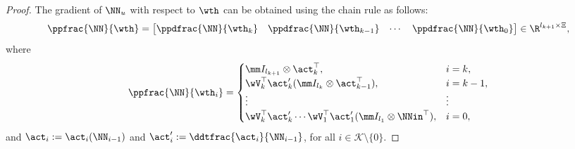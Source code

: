 \begin{proof}

  The gradient of $\NN_u$ with respect to $\wth$ can be obtained using the chain rule as follows:
  \begin{equation}
    \ppfrac{\NN}{\wth}=
    \begin{bmatrix}
      \ppdfrac{\NN}{\wth_k}&
      \ppdfrac{\NN}{\wth_{k-1}}&
  \cdots &
      \ppdfrac{\NN}{\wth_0}
    \end{bmatrix}
    \in\R^{l_{k+1} \times \Xi}
    ,
    \label{PRE:eq:NN:jacobian}
  \end{equation}
  where
  \begin{equation}
    \ppfrac{\NN}{\wth_i} = 
    \begin{cases}
        \mm I_{l_{k+1}}
        \otimes 
        \act_{k}^\top  
      , 
      &
      i=k
      ,
      \\
      \wV_k^\top\act_{k}' 
      (
        \mm I_{l_{k}}
        \otimes  
        \act_{k-1}^\top  
      )
      , 
      & 
      i=k-1
      ,
      \\
      \vdots 
      &
      \vdots 
      \\
      \wV_k^\top\act'_{k} 
      \cdots 
      \wV_1^\top\act_1' 
      (
        \mm I_{l_1}
        \otimes 
        \NNin^\top  
      )
      , 
      &
      i = 0
      ,
    \end{cases}
  \end{equation}
  and $\act_i:= \act_i(\NN_{i-1})$ and $\act_i':= \ddtfrac{\act_i}{\NN_{i-1}}$, for all $i\in\mathcal{K}\setminus\{0\}$.


\end{proof}

